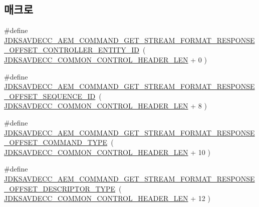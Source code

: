 \subsection*{매크로}
\begin{DoxyCompactItemize}
\item 
\#define \hyperlink{group__command__get__stream__format__response_ga2c3bf0e453a380f9fe723b851031f4e0}{J\+D\+K\+S\+A\+V\+D\+E\+C\+C\+\_\+\+A\+E\+M\+\_\+\+C\+O\+M\+M\+A\+N\+D\+\_\+\+G\+E\+T\+\_\+\+S\+T\+R\+E\+A\+M\+\_\+\+F\+O\+R\+M\+A\+T\+\_\+\+R\+E\+S\+P\+O\+N\+S\+E\+\_\+\+O\+F\+F\+S\+E\+T\+\_\+\+C\+O\+N\+T\+R\+O\+L\+L\+E\+R\+\_\+\+E\+N\+T\+I\+T\+Y\+\_\+\+ID}~( \hyperlink{group__jdksavdecc__avtp__common__control__header_gaae84052886fb1bb42f3bc5f85b741dff}{J\+D\+K\+S\+A\+V\+D\+E\+C\+C\+\_\+\+C\+O\+M\+M\+O\+N\+\_\+\+C\+O\+N\+T\+R\+O\+L\+\_\+\+H\+E\+A\+D\+E\+R\+\_\+\+L\+EN} + 0 )
\item 
\#define \hyperlink{group__command__get__stream__format__response_gaf19066d0a285a7ef7cbefc0111b3a650}{J\+D\+K\+S\+A\+V\+D\+E\+C\+C\+\_\+\+A\+E\+M\+\_\+\+C\+O\+M\+M\+A\+N\+D\+\_\+\+G\+E\+T\+\_\+\+S\+T\+R\+E\+A\+M\+\_\+\+F\+O\+R\+M\+A\+T\+\_\+\+R\+E\+S\+P\+O\+N\+S\+E\+\_\+\+O\+F\+F\+S\+E\+T\+\_\+\+S\+E\+Q\+U\+E\+N\+C\+E\+\_\+\+ID}~( \hyperlink{group__jdksavdecc__avtp__common__control__header_gaae84052886fb1bb42f3bc5f85b741dff}{J\+D\+K\+S\+A\+V\+D\+E\+C\+C\+\_\+\+C\+O\+M\+M\+O\+N\+\_\+\+C\+O\+N\+T\+R\+O\+L\+\_\+\+H\+E\+A\+D\+E\+R\+\_\+\+L\+EN} + 8 )
\item 
\#define \hyperlink{group__command__get__stream__format__response_ga7eb2723c2f20c97776bcbae92b669c20}{J\+D\+K\+S\+A\+V\+D\+E\+C\+C\+\_\+\+A\+E\+M\+\_\+\+C\+O\+M\+M\+A\+N\+D\+\_\+\+G\+E\+T\+\_\+\+S\+T\+R\+E\+A\+M\+\_\+\+F\+O\+R\+M\+A\+T\+\_\+\+R\+E\+S\+P\+O\+N\+S\+E\+\_\+\+O\+F\+F\+S\+E\+T\+\_\+\+C\+O\+M\+M\+A\+N\+D\+\_\+\+T\+Y\+PE}~( \hyperlink{group__jdksavdecc__avtp__common__control__header_gaae84052886fb1bb42f3bc5f85b741dff}{J\+D\+K\+S\+A\+V\+D\+E\+C\+C\+\_\+\+C\+O\+M\+M\+O\+N\+\_\+\+C\+O\+N\+T\+R\+O\+L\+\_\+\+H\+E\+A\+D\+E\+R\+\_\+\+L\+EN} + 10 )
\item 
\#define \hyperlink{group__command__get__stream__format__response_ga6dc8fa7cca8f786844c40aba37d49d1d}{J\+D\+K\+S\+A\+V\+D\+E\+C\+C\+\_\+\+A\+E\+M\+\_\+\+C\+O\+M\+M\+A\+N\+D\+\_\+\+G\+E\+T\+\_\+\+S\+T\+R\+E\+A\+M\+\_\+\+F\+O\+R\+M\+A\+T\+\_\+\+R\+E\+S\+P\+O\+N\+S\+E\+\_\+\+O\+F\+F\+S\+E\+T\+\_\+\+D\+E\+S\+C\+R\+I\+P\+T\+O\+R\+\_\+\+T\+Y\+PE}~( \hyperlink{group__jdksavdecc__avtp__common__control__header_gaae84052886fb1bb42f3bc5f85b741dff}{J\+D\+K\+S\+A\+V\+D\+E\+C\+C\+\_\+\+C\+O\+M\+M\+O\+N\+\_\+\+C\+O\+N\+T\+R\+O\+L\+\_\+\+H\+E\+A\+D\+E\+R\+\_\+\+L\+EN} + 12 )

\end{DoxyCompactItemize}
